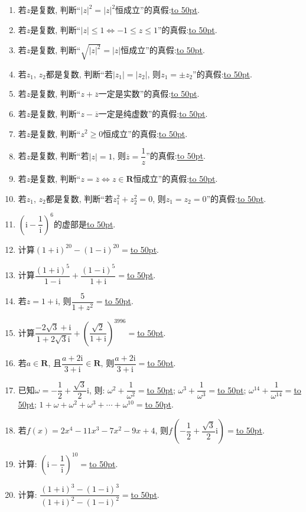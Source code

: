 \documentclass[10pt,a4paper]{article}
\newcommand{\blank}[1]{\underline{\hbox to #1pt{}}}
\begin{document}
\begin{enumerate}[1.]
\item 若$z$是复数, 判断``$|z|^2=|z|^2$恒成立''的真假:\blank{50}.
\item 若$z$是复数, 判断``$|z|\le 1\Leftrightarrow -1\le z\le 1$''的真假:\blank{50}.
\item 若$z$是复数, 判断``$\sqrt {|z|^2}=|z|$恒成立''的真假:\blank{50}.
\item 若$z_1$, $z_2$都是复数, 判断``若$|z_1|=|z_2|$, 则$z_1=\pm z_2$''的真假:\blank{50}.
\item 若$z$是复数, 判断``$z+\overline z$一定是实数''的真假:\blank{50}.
\item 若$z$是复数, 判断``$z-\overline z$一定是纯虚数''的真假:\blank{50}.
\item 若$z$是复数, 判断``$z^2\ge 0$恒成立''的真假:\blank{50}.
\item 若$z$是复数, 判断``若$|z|=1$, 则$\overline z=\dfrac 1z$''的真假:\blank{50}.
\item 若$z$是复数, 判断``$z=\overline z\Leftrightarrow z\in \mathbf{R}$恒成立''的真假:\blank{50}.
\item 若$z_1$, $z_2$都是复数, 判断``若$z_1^2+z_2^2=0$, 则$z_1=z_2=0$''的真假:\blank{50}.
\item $(\mathrm{i}-\dfrac 1{\mathrm{i}})^6$的虚部是\blank{50}.
\item 计算$(1+\mathrm{i})^{20}-(1-\mathrm{i})^{20}=$\blank{50}.
\item 计算$\dfrac{(1+\mathrm{i})^5}{1-\mathrm{i}}+\dfrac{(1-\mathrm{i})^5}{1+\mathrm{i}}=$\blank{50}.
\item 若$z=1+\mathrm{i}$, 则$\dfrac 5{1+z^2}=$\blank{50}.
\item 计算$\dfrac{-2\sqrt 3+\mathrm{i}}{1+2\sqrt 3\mathrm{i}}+(\dfrac{\sqrt 2}{1+\mathrm{i}})^{3996}=$\blank{50}.
\item 若$a\in \mathbf{R}$, 且$\dfrac{a+2\mathrm{i}}{3+\mathrm{i}}\in \mathbf{R}$, 则$\dfrac{a+2\mathrm{i}}{3+\mathrm{i}}=$\blank{50}.
\item 已知$\omega =-\dfrac 12+\dfrac{\sqrt 3}2\mathrm{i}$, 则: $\omega ^2+\dfrac 1{\omega ^2}=$\blank{50}; $\omega ^3+\dfrac 1{\omega ^3}=$\blank{50}; $\omega ^{14}+\dfrac 1{\omega ^{14}}=$\blank{50}; $1+\omega +\omega ^2+\omega ^3+\cdots +\omega ^{10}=$\blank{50}.
\item 若$f(x)=2x^4-11x^3-7x^2-9x+4$, 则$f(-\dfrac 12+\dfrac{\sqrt 3}2\mathrm{i})=$\blank{50}.
\item 计算: $(\mathrm{i}-\dfrac 1{\mathrm{i}})^{10}=$\blank{50}.
\item 计算: $\dfrac{{{(1+\mathrm{i})}^3}-{{(1-\mathrm{i})}^3}}{{{(1+\mathrm{i})}^2}-{{(1-\mathrm{i})}^2}}=$\blank{50}.

\end{enumerate}
\end{document}
